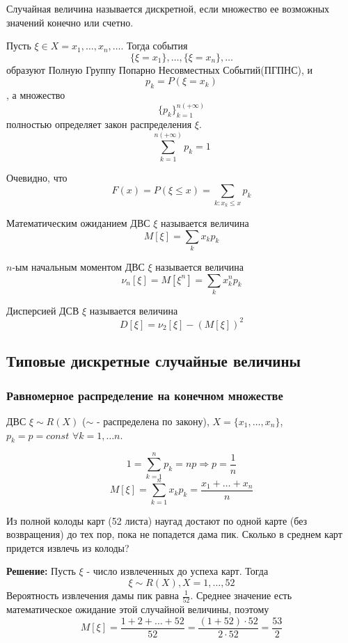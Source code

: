 \begin{definition}
Случайная величина называется дискретной, если множество ее возможных значений
конечно или счетно.
\end{definition}

\begin{remark}
Пусть $\xi \in X = {x_1, \ldots, x_n, \ldots}$. Тогда события
$$\{\xi = x_1\}, \ldots, \{\xi = x_n\}, \ldots$$
образуют Полную Группу Попарно Несовместных Событий(ПГПНС), и
    $$p_k = P(\xi = x_k)$$, а множество
    $$\{p_k\}_{k = 1}^{n (+\infty)}$$
полностью определяет закон распределения $\xi$.
    $$\sum_{k = 1}^{n (+\infty)} p_k = 1$$
\end{remark}

\begin{remark}
Очевидно, что $$F(x) = P(\xi \leq x) = \sum_{k : x_k \leq x}{} p_k$$
\end{remark}

\begin{definition}
Математическим ожиданием ДВС $\xi$ называется величина
    $$M[\xi] = \sum_{k}x_k p_k$$
\end{definition}

\begin{definition}
$n$-ым начальным моментом ДВС $\xi$ называется величина
    $$\nu_n[\xi] = M[\xi^n] = \sum_{k}{}x_k^np_k$$
\end{definition}

\begin{definition}
Дисперсией ДСВ $\xi$ называется величина
    $$D[\xi] = \nu_2[\xi] - (M[\xi])^2$$
\end{definition}

\subsection{Типовые дискретные случайные величины}
\subsubsection{Равномерное распределение на конечном множестве}
ДВС $\xi \sim R(X)$ ($\sim$ - распределена по закону),
$X = \{x_1, \ldots, x_n\}$, \\
$p_k = p = const$ $\forall k = 1, \ldots n.$

$$1 = \sum_{k = 1}^{n}p_k = np \Rightarrow p = \frac{1}{n}$$
$$M[\xi] = \sum_{k = 1}^{n}x_kp_k = \frac{x_1 + \ldots + x_n}{n}$$

\begin{example}
    Из полной колоды карт (52 листа) наугад достают
    по одной карте (без возвращения) до тех пор, пока
    не попадется дама пик. Сколько в среднем карт придется
    извлечь из колоды?

    \textbf{Решение:} Пусть $\xi$ - число извлеченных до успеха карт. Тогда
    $$\xi \sim R(X), X = {1, \ldots, 52}$$
    Вероятность извлечения дамы пик равна $\frac{1}{52}$.
    Среднее значение есть математическое ожидание этой случайной величины, поэтому
    $$M[\xi] = \frac{1 + 2 + \ldots + 52}{52} = \frac{(1 + 52) \cdot 52}{2 \cdot 52} = \frac{53}{2}$$
\end{example}

